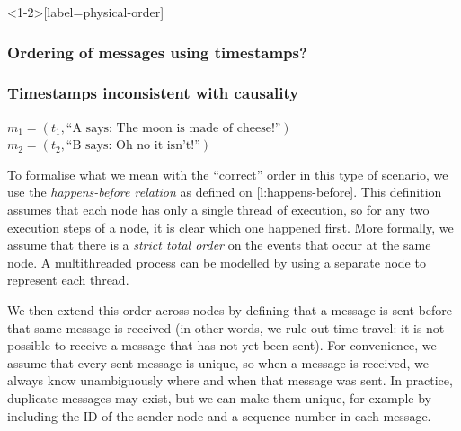 \begin{frame}<1-2>[label=physical-order]
    \label{s:physical-order}
    \frametitle<1-2>{Ordering of messages using timestamps?}
    \frametitle<3>{Timestamps inconsistent with causality}
    \begin{center}
    \end{center}
    $m_1 = (t_1, \text{``A says: The moon is made of cheese!''})$\\
    $m_2 = (t_2, \text{``B says: Oh no it isn't!''})$\\[1em]%
\end{frame}
\label{l:physical-order}

To formalise what we mean with the ``correct'' order in this type of scenario, we use the \emph{happens-before relation} as defined on \autoref{l:happens-before}.
This definition assumes that each node has only a single thread of execution, so for any two execution steps of a node, it is clear which one happened first.
More formally, we assume that there is a \emph{strict total order} on the events that occur at the same node.
A multithreaded process can be modelled by using a separate node to represent each thread.

We then extend this order across nodes by defining that a message is sent before that same message is received (in other words, we rule out time travel: it is not possible to receive a message that has not yet been sent).
For convenience, we assume that every sent message is unique, so when a message is received, we always know unambiguously where and when that message was sent.
In practice, duplicate messages may exist, but we can make them unique, for example by including the ID of the sender node and a sequence number in each message.

